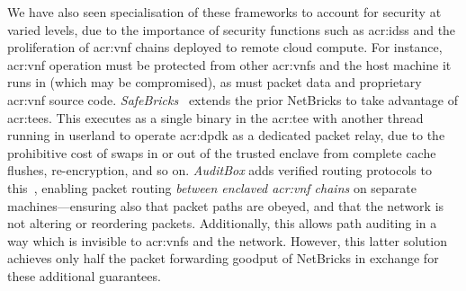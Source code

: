 We have also seen specialisation of these frameworks to account for security at varied levels, due to the importance of security functions such as \glspl{acr:ids} and the proliferation of \gls{acr:vnf} chains deployed to remote cloud compute.
For instance, \gls{acr:vnf} operation must be protected from other \glspl{acr:vnf} and the host machine it runs in (which may be compromised), as must packet data and proprietary \gls{acr:vnf} source code.
\emph{SafeBricks}~\parencite{DBLP:conf/nsdi/PoddarLPR18} extends the prior NetBricks to take advantage of \glspl{acr:tee}.
This executes as a single binary in the \gls{acr:tee} with another thread running in userland to operate \gls{acr:dpdk} as a dedicated packet relay, due to the prohibitive cost of swaps in or out of the trusted enclave from complete cache flushes, re-encryption, and so on.
\emph{AuditBox} adds verified routing protocols to this~\parencite{DBLP:conf/nsdi/LiuSKPSS21}, enabling packet routing \emph{between enclaved \gls{acr:vnf} chains} on separate machines---ensuring also that packet paths are obeyed, and that the network is not altering or reordering packets.
Additionally, this allows path auditing in a way which is invisible to \glspl{acr:vnf} and the network.
However, this latter solution achieves only half the packet forwarding goodput of NetBricks in exchange for these additional guarantees.

